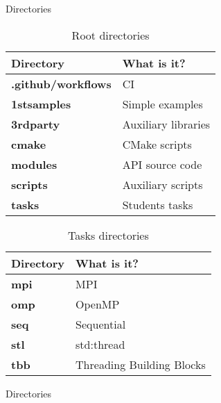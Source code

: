 \documentclass{beamer}
\begin{document}
\begin{frame}[fragile]{Directories}
  \begin{table}[h!]
    \resizebox{8cm}{!} {
      \begin{tabular}{| p{4.2 cm} | p{4.2 cm} |}
      \hline
      \textbf{Directory} & \textbf{What is it?} \\
      \hline
      \textbf{.github/workflows} & CI \\
      \hline
      \textbf{1stsamples} & Simple examples \\
      \hline
      \textbf{3rdparty} & Auxiliary libraries \\
      \hline
      \textbf{cmake} & CMake scripts \\
      \hline
      \textbf{modules} & API source code \\
      \hline
      \textbf{scripts} & Auxiliary scripts \\
      \hline
      \textbf{tasks} & Students tasks \\
      \hline
    \end{tabular}
    }
    \caption{Root directories}
  \end{table}

  \begin{table}[h!]
    \resizebox{8cm}{!} {
    \begin{tabular}{| p{4.2 cm} | p{4.2 cm} |}
      \hline
      \textbf{Directory} & \textbf{What is it?} \\
      \hline
      \textbf{mpi} & MPI \\
      \hline
      \textbf{omp} & OpenMP \\
      \hline
      \textbf{seq} & Sequential \\
      \hline
      \textbf{stl} & std:thread \\
      \hline
      \textbf{tbb} & Threading Building Blocks \\
      \hline
    \end{tabular}
    }
    \caption{Tasks directories}
  \end{table}

\end{frame}

\begin{frame}[fragile]{Directories}
\end{frame}
\end{document}
